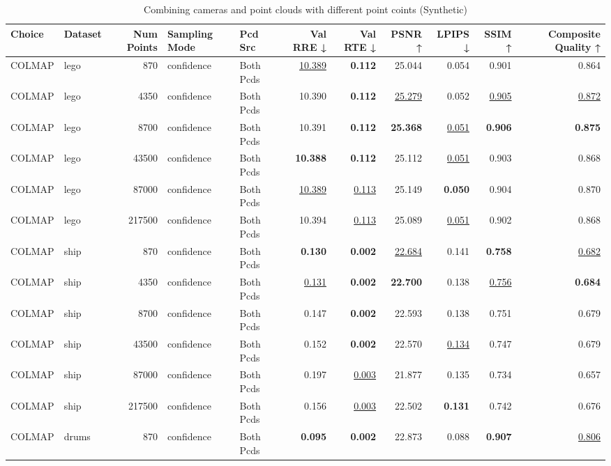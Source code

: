 \begin{table}[H]
\caption{Combining cameras and point clouds with different point coints (Synthetic)}
\label{tab:07_combined_num_points_synthetic}
\centering
\scriptsize
\begin{tabular}{llrllrrrrrr}
\toprule
Choice & Dataset & Num Points & Sampling Mode & Pcd Src & Val RRE ↓ & Val RTE ↓ & PSNR ↑ & LPIPS ↓ & SSIM ↑ & Composite Quality ↑ \\
\midrule
COLMAP & lego & 870 & confidence & Both Pcds & \underline{10.389} & \textbf{0.112} & 25.044 & 0.054 & 0.901 & 0.864 \\
COLMAP & lego & 4350 & confidence & Both Pcds & 10.390 & \textbf{0.112} & \underline{25.279} & 0.052 & \underline{0.905} & \underline{0.872} \\
COLMAP & lego & 8700 & confidence & Both Pcds & 10.391 & \textbf{0.112} & \textbf{25.368} & \underline{0.051} & \textbf{0.906} & \textbf{0.875} \\
COLMAP & lego & 43500 & confidence & Both Pcds & \textbf{10.388} & \textbf{0.112} & 25.112 & \underline{0.051} & 0.903 & 0.868 \\
COLMAP & lego & 87000 & confidence & Both Pcds & \underline{10.389} & \underline{0.113} & 25.149 & \textbf{0.050} & 0.904 & 0.870 \\
COLMAP & lego & 217500 & confidence & Both Pcds & 10.394 & \underline{0.113} & 25.089 & \underline{0.051} & 0.902 & 0.868 \\
\midrule
COLMAP & ship & 870 & confidence & Both Pcds & \textbf{0.130} & \textbf{0.002} & \underline{22.684} & 0.141 & \textbf{0.758} & \underline{0.682} \\
COLMAP & ship & 4350 & confidence & Both Pcds & \underline{0.131} & \textbf{0.002} & \textbf{22.700} & 0.138 & \underline{0.756} & \textbf{0.684} \\
COLMAP & ship & 8700 & confidence & Both Pcds & 0.147 & \textbf{0.002} & 22.593 & 0.138 & 0.751 & 0.679 \\
COLMAP & ship & 43500 & confidence & Both Pcds & 0.152 & \textbf{0.002} & 22.570 & \underline{0.134} & 0.747 & 0.679 \\
COLMAP & ship & 87000 & confidence & Both Pcds & 0.197 & \underline{0.003} & 21.877 & 0.135 & 0.734 & 0.657 \\
COLMAP & ship & 217500 & confidence & Both Pcds & 0.156 & \underline{0.003} & 22.502 & \textbf{0.131} & 0.742 & 0.676 \\
\midrule
COLMAP & drums & 870 & confidence & Both Pcds & \textbf{0.095} & \textbf{0.002} & 22.873 & 0.088 & \textbf{0.907} & \underline{0.806} \\

\end{tabular}
\end{table}
